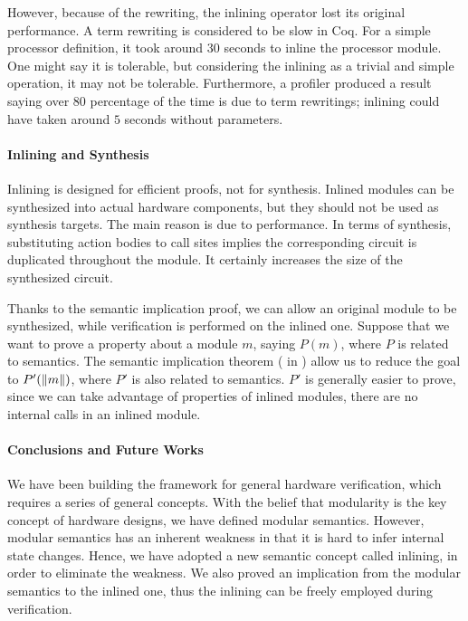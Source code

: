 However, because of the rewriting, the inlining operator lost its
original performance. A term rewriting is considered to be slow in
Coq. For a simple processor definition, it took around $30$ seconds to
inline the processor module. One might say it is tolerable, but
considering the inlining as a trivial and simple operation, it may not
be tolerable. Furthermore, a profiler produced a result saying over
$80$ percentage of the time is due to term rewritings; inlining could
have taken around $5$ seconds without parameters.

\paragraph{Inlining and Synthesis}

Inlining is designed for efficient proofs, not for synthesis. Inlined
modules can be synthesized into actual hardware components, but they
should not be used as synthesis targets. The main reason is due to
performance. In terms of synthesis, substituting action bodies to call
sites implies the corresponding circuit is duplicated throughout the
module. It certainly increases the size of the synthesized circuit.

Thanks to the semantic implication proof, we can allow an original
module to be synthesized, while verification is performed on the
inlined one. Suppose that we want to prove a property about a module
$m$, saying $P(m)$, where $P$ is related to semantics. The semantic
implication theorem ( in
) allow us to reduce the goal to
$P'(\| m \|)$, where $P'$ is also related to semantics. $P'$ is
generally easier to prove, since we can take advantage of properties
of inlined modules, \eg{} there are no internal calls in an inlined
module.

\paragraph{Conclusions and Future Works}

We have been building the \Kami{} framework for general hardware
verification, which requires a series of general concepts. With the
belief that modularity is the key concept of hardware designs, we have
defined modular semantics. However, modular semantics has an inherent
weakness in that it is hard to infer internal state changes. Hence, we
have adopted a new semantic concept called inlining, in order to
eliminate the weakness. We also proved an implication from the modular
semantics to the inlined one, thus the inlining can be freely employed
during verification.

